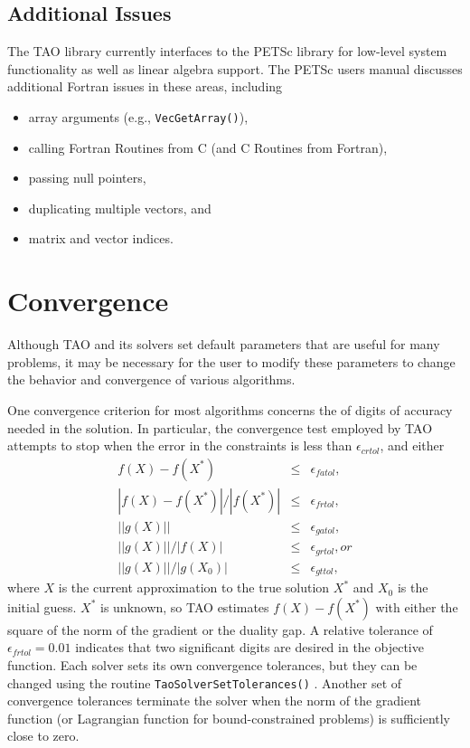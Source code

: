 \subsection{Additional Issues}

The TAO library currently interfaces to the PETSc library for
low-level system functionality as well as linear algebra support.  The
PETSc users manual discusses additional Fortran issues in these areas,
including
\begin{itemize}
\item array arguments (e.g., {\tt VecGetArray()}),
\item calling Fortran Routines from C (and C Routines from Fortran),
\item passing null pointers,
\item duplicating multiple vectors, and
\item matrix and vector indices.
\end{itemize}




\section{Convergence}\label{sec:customize}

Although TAO and its solvers set default parameters 
that are useful
for many problems, it may be necessary for the user to modify these
parameters to change the behavior and convergence of various algorithms.

One convergence criterion for most algorithms concerns the
of digits of accuracy needed in the solution.  In particular,
the convergence test employed by TAO attempts to stop when
the error in the constraints is less than $\epsilon_{crtol}$,
 and either
\[
\begin{array}{lcl}
f(X) - f(X^*)  &\leq& \epsilon_{fatol}, \\
|f(X) - f(X^*)| / |f(X^*)| &\leq& \epsilon_{frtol},\\
||g(X)|| &\leq& \epsilon_{gatol}, \\
||g(X)||/|f(X)| &\leq& \epsilon_{grtol}, or \\
||g(X)||/|g(X_0)| &\leq& \epsilon_{gttol},
\end{array}
\]
where $X$ is the current approximation to the true solution $X^*$
and $X_0$ is the initial guess.
$X^*$ is unknown, so TAO estimates $f(X) - f(X^*)$ with either 
the square of the norm of the gradient or the duality gap.
A relative tolerance of $\epsilon_{frtol}=0.01$ indicates that two
significant digits are desired in the objective function.
Each solver sets its own  convergence tolerances, but they can
be changed using the routine
{\tt TaoSolverSetTolerances()} 
. 
Another set of convergence tolerances 
terminate the solver when the norm of the gradient function
(or Lagrangian function for bound-constrained problems)
is sufficiently close to zero.

